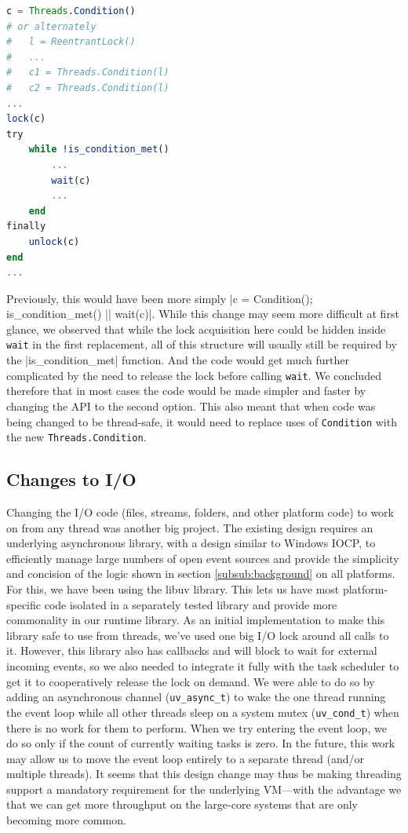 \documentclass{juliacon}
\begin{document}
\begin{lstlisting}[language = Julia]
c = Threads.Condition()
# or alternately
#   l = ReentrantLock()
#   ...
#   c1 = Threads.Condition(l)
#   c2 = Threads.Condition(l)
...
lock(c)
try
    while !is_condition_met()
        ...
        wait(c)
        ...
    end
finally
    unlock(c)
end
...
\end{lstlisting}

Previously, this would have been more simply |c = Condition(); is_condition_met() || wait(c)|.  While this change may seem more difficult at first glance, we observed that while the lock acquisition here could be hidden inside \verb|wait| in the first replacement, all of this structure will usually still be required by the |is_condition_met| function. And the code would get much further complicated by the need to release the lock before calling \verb|wait|. We concluded therefore that in most cases the code would be made simpler and faster by changing the API to the second option. This also meant that when code was being changed to be thread-safe, it would need to replace uses of \verb|Condition| with the new \verb|Threads.Condition|.

\subsection{Changes to I/O}
\label{subsub:integration-io}

Changing the I/O code (files, streams, folders, and other platform code) to work on from any thread was another big project. The existing design requires an underlying asynchronous library, with a design similar to Windows IOCP, to efficiently manage large numbers of open event sources and provide the simplicity and concision of the logic shown in section \ref{subsub:background} on all platforms. For this, we have been using the libuv library. This lets us have most platform-specific code isolated in a separately tested library and provide more commonality in our runtime library. As an initial implementation to make this library safe to use from threads, we've used one big I/O lock around all calls to it. However, this library also has callbacks and will block to wait for external incoming events, so we also needed to integrate it fully with the task scheduler to get it to cooperatively release the lock on demand. We were able to do so by adding an asynchronous channel (\verb|uv_async_t|) to wake the one thread running the event loop while all other threads sleep on a system mutex (\verb|uv_cond_t|) when there is no work for them to perform. When we try entering the event loop, we do so only if the count of currently waiting tasks is zero. In the future, this work may allow us to move the event loop entirely to a separate thread (and/or multiple threads). It seems that this design change may thus be making threading support a mandatory requirement for the underlying VM—with the advantage we that we can get more throughput on the large-core systems that are only becoming more common.
\end{document}
